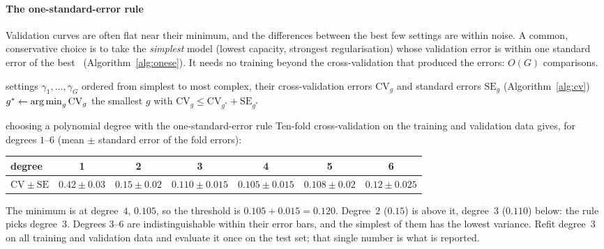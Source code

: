 \documentclass[11pt]{article}
\begin{document}
\paragraph{The one-standard-error rule} Validation curves are often flat near their minimum, and the differences
between the best few settings are within noise. A common, conservative choice is to take the \emph{simplest} model
(lowest capacity, strongest regularisation) whose validation error is within one standard error of the
best~\cite{hastie2009} (Algorithm~\ref{alg:onese}). It needs no training beyond the cross-validation that produced the
errors: $O(G)$ comparisons.

\begin{algorithm}[htbp]\small
\caption{The one-standard-error rule}
\label{alg:onese}
\begin{algorithmic}[1]
\Require settings $\gamma_1, \dots, \gamma_G$ ordered from simplest to most complex, their cross-validation errors
$\mathrm{CV}_g$ and standard errors $\mathrm{SE}_g$ (Algorithm~\ref{alg:cv})
  \State $g^* \gets \operatorname*{arg\,min}_g \mathrm{CV}_g$ 
  \State \Return the smallest $g$ with $\mathrm{CV}_g \le \mathrm{CV}_{g^*} + \mathrm{SE}_{g^*}$ 
\EndFunction
\end{algorithmic}
\end{algorithm}

\begin{worked}{choosing a polynomial degree with the one-standard-error rule}
Ten-fold cross-validation on the training and validation data gives, for degrees $1$--$6$ (mean $\pm$ standard error of
the fold errors):
\begin{center}\small
\begin{tabular}{@{}lcccccc@{}}
\toprule
degree & 1 & 2 & 3 & 4 & 5 & 6 \\
\midrule
$\mathrm{CV} \pm \mathrm{SE}$ & $0.42 \pm 0.03$ & $0.15 \pm 0.02$ & $0.110 \pm 0.015$ & $0.105 \pm 0.015$ & $0.108 \pm 0.02$ & $0.12 \pm 0.025$ \\
\bottomrule
\end{tabular}
\end{center}
The minimum is at degree~$4$, $0.105$, so the threshold is $0.105 + 0.015 = 0.120$. Degree~$2$ ($0.15$) is above it,
degree~$3$ ($0.110$) below: the rule picks degree~$3$. Degrees $3$--$6$ are indistinguishable within their error bars,
and the simplest of them has the lowest variance. Refit degree~$3$ on all training and validation data and evaluate it
once on the test set; that single number is what is reported.
\end{worked}
\end{document}
